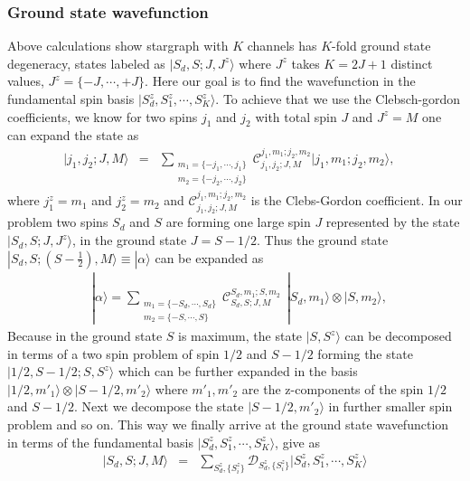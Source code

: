\documentclass[reprint,prb,superscriptaddress]{revtex4-1}
\begin{document}
\subsubsection{Ground state wavefunction}
\noindent Above calculations show stargraph with $K$ channels has $K$-fold ground state degeneracy, states labeled as $|S_d,S;J,J^z\rangle$ where $J^z$ takes $K=2J+1$ distinct values, $J^z=\{-J,\cdots,+J \}$. Here our goal is to find the wavefunction in the fundamental spin basis $|S_d^z,S_1^z,\cdots,S_K^z\rangle$. To achieve that we use the Clebsch-gordon coefficients, we know for two spins $j_1$ and $j_2$  with total spin $J$ and $J^z=M$ one can expand the state as 
\begin{eqnarray}
|j_1,j_2;J,M\rangle &=& \displaystyle\sum_{\substack{m_1=\{-j_1,\cdots,j_1\} \\ m_2=\{-j_2,\cdots,j_2\} }}   \mathcal{C}^{j_1,m_1;j_2,m_2}_{j_1,j_2;J,M} |j_1,m_1;j_2,m_2 \rangle ,~~~~
\end{eqnarray}
where $j_1^z=m_1$ and $j_2^z=m_2$ and $\mathcal{C}^{j_1,m_1;j_2,m_2}_{j_1,j_2;J,M}$ is the Clebs-Gordon coefficient. In our problem two spins $S_d$ and $S$ are forming one large spin $J$ represented by the state $|S_d,S;J,J^z\rangle$, in the ground state $J=S-1/2$. Thus the ground state $|S_d,S; (S-\frac{1}{2} ),M\rangle \equiv |\alpha\rangle$ can be expanded as
\begin{eqnarray}
&&|\alpha\rangle= \displaystyle\sum_{\substack{m_1=\{-S_d,\cdots,S_d\} \\ m_2=\{-S,\cdots,S\} }} \mathcal{C}^{S_d,m_1;S,m_2}_{S_d,S;J,M} ~~   | S_d,m_1 \rangle \otimes  |S,m_2  \rangle ,~~~~
\end{eqnarray}
Because in the ground state $S$ is maximum, the state $|S,S^z\rangle$ can be decomposed in terms of a two spin problem of spin $1/2$ and $S-1/2$ forming the state $|1/2,S-1/2;S,S^z\rangle$ which can be further expanded in the basis $ |1/2,m'_1 \rangle \otimes  |S-1/2,m'_2  \rangle $ where $m'_1,m'_2$ are the z-components of the spin $1/2$ and $S-1/2$. Next we decompose the state $|S-1/2,m'_2\rangle$ in further smaller spin problem and so on. This way we finally arrive at the ground state wavefunction in terms of the fundamental basis $|S_d^z,S_1^z,\cdots,S_K^z\rangle$, give as
\begin{eqnarray}
|S_d,S;J,M\rangle &=& \sum_{S_d^z,\{S_i^z\}} \mathcal{D}_{S_d^z,\{S_i^z\}} |S_d^z,S_1^z,\cdots,S_K^z\rangle
\label{eq:wf_fundamental_basis}
\end{eqnarray}
\end{document}
